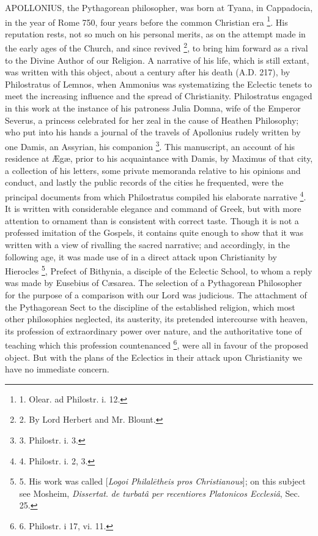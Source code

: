 APOLLONIUS,
the Pythagorean philosopher, was born at Tyana, in Cappadocia, in the
year of Rome 750, four years before the common Christian era \footnote{1. Olear. ad Philostr. i. 12.}. His reputation rests, not so much on his personal merits, as
on the attempt made in the early ages of the Church, and since revived
\footnote{2.
By Lord Herbert and Mr. Blount.}, to bring him forward as
a rival to the Divine Author of our Religion. A narrative of his life,
which is still extant, was written with this object, about a century
after his death (A.D.
217), by Philostratus of Lemnos, when Ammonius was systematizing the
Eclectic tenets to meet the increasing influence and the spread of
Christianity. Philostratus engaged in this work at the instance of his
patroness Julia Domna, wife of the Emperor Severus, a princess
celebrated for her zeal in the cause of Heathen Philosophy; who put
into his hands a journal of the travels of Apollonius rudely written
by one Damis, an Assyrian, his companion \footnote{3.
Philostr. i. 3.}. This manuscript, an account of his residence at Ægæ, prior
to his acquaintance with Damis, by Maximus of that city, a collection
of his letters, some private memoranda relative to his opinions and
conduct, and lastly the public records of the cities he frequented,
were the principal documents from which Philostratus compiled his
elaborate narrative \footnote{4.
Philostr. i. 2, 3.}.
It is written with considerable elegance and command of Greek,
but with more attention to ornament than is consistent with correct
taste. Though it is not a professed imitation of the Gospels, it
contains quite enough to show that it was written with a view of
rivalling the sacred narrative; and accordingly, in the following age,
it was made use of in a direct attack upon Christianity by Hierocles \footnote{5.
His work was called [\emph{Logoi Philal\={e}theis pros Christianous}];
on this subject see Mosheim, \emph{Dissertat}. \emph{de turbatâ per
recentiores Platonicos Ecclesiâ}, Sec. 25.}, Prefect of Bithynia, a disciple of the Eclectic School, to
whom a reply was made by Eusebius of Cæsarea. The selection of a
Pythagorean Philosopher for the purpose of a comparison with our Lord
was judicious. The attachment of the Pythagorean Sect to the
discipline of the established religion, which most other philosophies
neglected, its austerity, its pretended intercourse with heaven, its
profession of extraordinary power over nature, and the authoritative
tone of teaching which this profession countenanced \footnote{6.
Philostr. i 17, vi. 11.}, were all in favour of the proposed object. But with the plans
of the Eclectics in their attack upon Christianity we have no
immediate concern.

